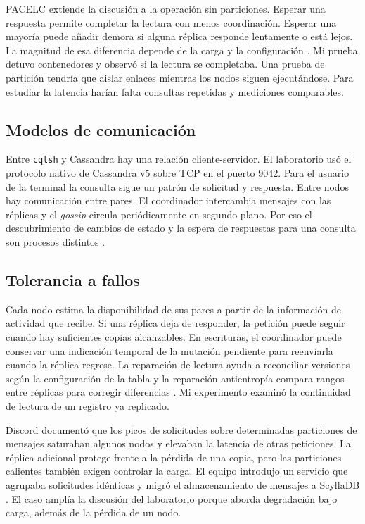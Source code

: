 \documentclass[12pt,a4paper]{article}
\begin{document}
PACELC extiende la discusión a la operación sin particiones. Esperar una respuesta permite completar la lectura con menos coordinación. Esperar una mayoría puede añadir demora si alguna réplica responde lentamente o está lejos. La magnitud de esa diferencia depende de la carga y la configuración \cite{ferreira2024,redzepagic2026}. Mi prueba detuvo contenedores y observó si la lectura se completaba. Una prueba de partición tendría que aislar enlaces mientras los nodos siguen ejecutándose. Para estudiar la latencia harían falta consultas repetidas y mediciones comparables.

\subsection{Modelos de comunicación}
Entre \texttt{cqlsh} y Cassandra hay una relación cliente-servidor. El laboratorio usó el protocolo nativo de Cassandra v5 sobre TCP en el puerto 9042. Para el usuario de la terminal la consulta sigue un patrón de solicitud y respuesta. Entre nodos hay comunicación entre pares. El coordinador intercambia mensajes con las réplicas y el \textit{gossip} circula periódicamente en segundo plano. Por eso el descubrimiento de cambios de estado y la espera de respuestas para una consulta son procesos distintos \cite{cassandraDynamo}.

\subsection{Tolerancia a fallos}
Cada nodo estima la disponibilidad de sus pares a partir de la información de actividad que recibe. Si una réplica deja de responder, la petición puede seguir cuando hay suficientes copias alcanzables. En escrituras, el coordinador puede conservar una indicación temporal de la mutación pendiente para reenviarla cuando la réplica regrese. La reparación de lectura ayuda a reconciliar versiones según la configuración de la tabla y la reparación antientropía compara rangos entre réplicas para corregir diferencias \cite{cassandraDynamo}. Mi experimento examinó la continuidad de lectura de un registro ya replicado.

Discord documentó que los picos de solicitudes sobre determinadas particiones de mensajes saturaban algunos nodos y elevaban la latencia de otras peticiones. La réplica adicional protege frente a la pérdida de una copia, pero las particiones calientes también exigen controlar la carga. El equipo introdujo un servicio que agrupaba solicitudes idénticas y migró el almacenamiento de mensajes a ScyllaDB \cite{discord2023}. El caso amplía la discusión del laboratorio porque aborda degradación bajo carga, además de la pérdida de un nodo.
\end{document}
